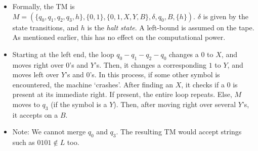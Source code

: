\documentclass{article}
\newcommand{\I}[1]{\textit{#1}}
\begin{document}
\begin{sloppypar}
\begin{itemize}
        \begin{itemize}
            \item Formally, the TM is $M=(\{q_0,q_1,q_2,q_3,h\},\{0,1\},\{0,1,X,Y,B\},\delta,q_0,B,\{h\})$. $\delta$ is given by the state transitions, and $h$ is the \I{halt state}. A left-bound is assumed on the tape. As mentioned earlier, this has no effect on the computational power.
            \item Starting at the left end, the loop $q_0-q_1-q_2-q_0$ changes a $0$ to $X$, and moves right over $0$'s and $Y$'s. Then, it changes a corresponding $1$ to $Y$, and moves left over $Y$'s and $0$'s. In this process, if some other symbol is encountered, the machine `crashes'. After finding an $X$, it checks if a $0$ is present at its immediate right. If present, the entire loop repeats. Else, $M$ moves to $q_3$ (if the symbol is a $Y$). Then, after moving right over several $Y$'s, it accepts on a $B$.
            \item Note: We cannot merge $q_0$ and $q_3$. The resulting TM would accept strings such as $0101\notin L$ too.
        \end{itemize}

    \end{itemize}





\end{sloppypar}
\end{document}
